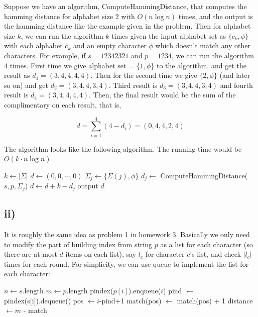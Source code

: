 Suppose we have an algorithm, ComputeHammingDistance, that computes the hamming distance for alphabet size 2 with $O(n\log n)$ times, and the output is the hamming distance like the example given in the problem.  Then for alphabet size $k$, we can run the algorithm $k$ times given the input alphabet set as $\{c_k, \phi\}$ with each alphabet $c_k$ and an empty character $\phi$ which doesn't match any other characters.  For example, if $s=12342321$ and $p=1234$, we can run the algorithm 4 times.  First time we give alphabet set = $\{1, \phi\}$ to the algorithm, and get the result as $d_1 = (3, 4, 4, 4, 4)$.  Then for the second time we give $\{2, \phi\}$ (and later so on) and get $d_2 = (3, 4, 4, 3, 4)$.  Third result is $d_3 = (3, 4, 4, 3, 4)$ and fourth result is $d_4 = (3, 4, 4, 4, 4)$.  Then, the final result would be the sum of the complimentary on each result, that is,

\[ d = \sum_{i=1}^{4}(4-d_i) = (0, 4, 4, 2, 4) \]

The algorithm looks like the following algorithm.  The running time would be $O(k\cdot n\log n)$.

\begin{algorithmic}[1]
	\State $k \gets |\Sigma|$
	\State $d \gets (0, 0, \cdots, 0)$	
		\State $\Sigma_j \gets \{\Sigma(j), \phi\}$
		\State $d_j \gets$ ComputeHammingDistance($s, p, \Sigma_j$)
		\State $d \gets d + k - d_j$
	\EndFor
	\State output $d$
\EndProcedure
\end{algorithmic}


\subsection*{ii)}

It is roughly the same idea as problem 1 in homework 3.  Basically we only need to modify the part of building index from string $p$ as a list for each character (so there are at most $d$ items on each list), say $l_c$ for character $c$'s list, and check $|l_c|$ times for each round.  For simplicity, we can use queue to implement the list for each character:

\begin{algorithmic}[1]
	\State $n \gets s$.length
	\State $m \gets p$.length
		
		\State pindex($p[i]$).enqueue($i$)
	\EndFor
		
			\State pind $\gets$ pindex(s[i]).dequeue()
			\State pos $\gets i$-pind+1
				\State match(pos) $\gets$ match(pos) + 1
			\EndIf
		\EndWhile
	\EndFor
	\State distance $\gets m$ - match	
\EndProcedure
\end{algorithmic}

